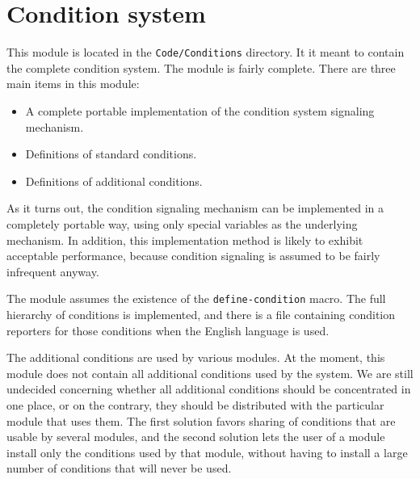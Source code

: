 \chapter{Condition system}

This module is located in the \texttt{Code/Conditions} directory.  It
it meant to contain the complete \commonlisp{} condition system.  The module
is fairly complete.  There are three main items in this module:

\begin{itemize}
\item A complete portable implementation of the \commonlisp{} condition
  system signaling mechanism.
\item Definitions of standard \commonlisp{} conditions.
\item Definitions of additional \sysname{} conditions.
\end{itemize}

As it turns out, the \commonlisp{} condition signaling mechanism can be
implemented in a completely portable way, using only special variables
as the underlying mechanism.  In addition, this implementation method
is likely to exhibit acceptable performance, because condition
signaling is assumed to be fairly infrequent anyway.  

The module assumes the existence of the \texttt{define-condition}
macro.  The full hierarchy of \commonlisp{} conditions is implemented, and
there is a file containing condition reporters for those conditions
when the English language is used.

The additional conditions are used by various \sysname{} modules.
At the moment, this module does not contain all additional conditions
used by the system.  We are still undecided concerning whether all
additional conditions should be concentrated in one place, or on the
contrary, they should be distributed with the particular module that
uses them.  The first solution favors sharing of conditions that are
usable by several modules, and the second solution lets the user of a
module install only the conditions used by that module, without having
to install a large number of conditions that will never be used.
